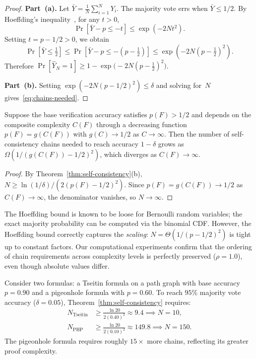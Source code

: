 \begin{proof}
\textbf{Part~(a).}  Let $\bar{Y} = \frac{1}{N}\sum_{i=1}^N Y_i$.  The
majority vote errs when $\bar{Y} \le 1/2$.  By Hoeffding's
inequality~\cite{hoeffding1963probability}, for any $t > 0$,
\[
\Pr\!\left[\bar{Y} - p \le -t\right]
  \le \exp(-2Nt^2).
\]
Setting $t = p - 1/2 > 0$, we obtain
\[
\Pr\!\left[\bar{Y} \le \tfrac{1}{2}\right]
  \le \Pr\!\left[\bar{Y} - p \le -(p - \tfrac{1}{2})\right]
  \le \exp\!\left(-2N(p - \tfrac{1}{2})^2\right).
\]
Therefore $\Pr[\hat{Y}_N = 1] \ge 1 -
\exp\bigl(-2N(p - \tfrac{1}{2})^2\bigr)$.

\textbf{Part~(b).}  Setting $\exp(-2N(p - 1/2)^2) \le \delta$ and solving
for~$N$ gives~\eqref{eq:chains-needed}.
\end{proof}

\begin{corollary}\label{cor:compute-tradeoff}
Suppose the base verification accuracy satisfies $p(F) > 1/2$ and depends on
the composite complexity $C(F)$ through a decreasing function
$p(F) = g(C(F))$ with $g(C) \to 1/2$ as $C \to \infty$.  Then the number of
self-consistency chains needed to reach accuracy $1 - \delta$ grows as
$\Omega(1/(g(C(F)) - 1/2)^2)$, which diverges as $C(F) \to \infty$.
\end{corollary}

\begin{proof}
By Theorem~\ref{thm:self-consistency}(b), $N \ge \ln(1/\delta) /
(2(p(F) - 1/2)^2)$.  Since $p(F) = g(C(F)) \to 1/2$ as $C(F) \to \infty$,
the denominator vanishes, so $N \to \infty$.
\end{proof}

\begin{remark}\label{rem:hoeffding-tightness}
The Hoeffding bound is known to be loose for Bernoulli random variables; the
exact majority probability can be computed via the binomial CDF.  However, the
Hoeffding bound correctly captures the \emph{scaling}: $N = \Theta(1/(p -
1/2)^2)$ is tight up to constant factors.  Our computational experiments
confirm that the ordering of chain requirements across complexity levels is
perfectly preserved ($\rho = 1.0$), even though absolute values differ.
\end{remark}

\begin{example}\label{ex:chains-needed}
Consider two formulas: a Tseitin formula on a path graph with base accuracy
$p = 0.90$ and a pigeonhole formula with $p = 0.60$.  To reach $95\%$ majority
vote accuracy ($\delta = 0.05$), Theorem~\ref{thm:self-consistency} requires:
\begin{align*}
N_{\text{Tseitin}} &\ge \frac{\ln 20}{2(0.40)^2} \approx 9.4
  \implies N = 10, \\
N_{\text{PHP}} &\ge \frac{\ln 20}{2(0.10)^2} \approx 149.8
  \implies N = 150.
\end{align*}
The pigeonhole formula requires roughly $15\times$ more chains, reflecting its
greater proof complexity.
\end{example}


